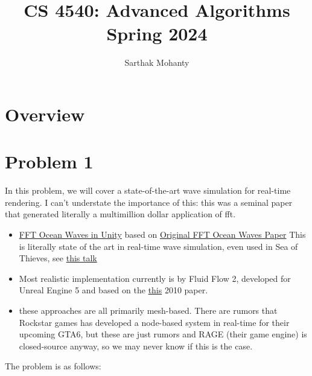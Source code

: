 \documentclass{article}
\title{\vspace{-1cm}CS 4540: Advanced Algorithms \\ Spring 2024}
\author{Sarthak Mohanty}
\date{}
\begin{document}
\maketitle

\vspace{-1cm}
\section*{Overview}

\section*{Problem 1}
    In this problem, we will cover a state-of-the-art wave simulation for real-time rendering. I can't understate the importance of this: this was a seminal paper that generated literally a multimillion dollar application of fft.
    \begin{itemize}
        \item \href{https://www.youtube.com/watch?v=kGEqaX4Y4bQ}{FFT Ocean Waves in Unity} based on \href{https://people.computing.clemson.edu/~jtessen/reports/papers_files/coursenotes2004.pdf}{Original FFT Ocean Waves Paper} This is literally state of the art in real-time wave simulation, even used in Sea of Thieves, see \href{https://dl.acm.org/doi/pdf/10.1145/3214745.3214820}{this talk}
        \item Most realistic implementation currently is by Fluid Flow 2, developed for Unreal Engine 5 and based on the \href{https://matthias-research.github.io/pages/publications/hfFluid.pdf}{this} 2010 paper.
        \item these approaches are all primarily mesh-based. There are rumors that Rockstar games has developed a node-based system in real-time for their upcoming GTA6, but these are just rumors and RAGE (their game engine) is closed-source anyway, so we may never know if this is the case.
    \end{itemize}

    The problem is as follows: 
\end{document}
